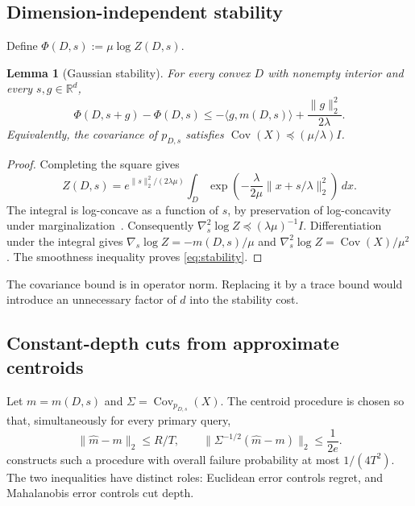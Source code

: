 \documentclass[11pt]{article}
\newcommand{\R}{\mathbb R}
\newcommand{\Cov}{\operatorname{Cov}}
\newcommand{\ip}[2]{\langle #1,#2\rangle}
\newcommand{\norm}[1]{\lVert #1\rVert}
\newtheorem{lemma}[lemma]{Lemma}
\theoremstyle{definition}
\begin{document}
\subsection{Dimension-independent stability}

Define $\Phi(D,s):=\mu\log Z(D,s)$.

\begin{lemma}[Gaussian stability]\label{lem:stability}
For every convex $D$ with nonempty interior and every $s,g\in\R^d$,
\begin{equation}\label{eq:stability}
 \Phi(D,s+g)-\Phi(D,s)
 \le-\ip{g}{m(D,s)}+\frac{\norm{g}_2^2}{2\lambda}.
\end{equation}
Equivalently, the covariance of $p_{D,s}$ satisfies
$\Cov(X)\preceq(\mu/\lambda)I$.
\end{lemma}

\begin{proof}
Completing the square gives
\[
 Z(D,s)=e^{\norm{s}_2^2/(2\lambda\mu)}
 \int_D\exp\!\left(-\frac{\lambda}{2\mu}
                  \norm{x+s/\lambda}_2^2\right)\,dx.
\]
The integral is log-concave as a function of $s$, by preservation of
log-concavity under marginalization~\cite[Theorem~5.1]{lovaszvempala2007}.
Consequently $\nabla_s^2\log Z\preceq(\lambda\mu)^{-1}I$.
Differentiation under the integral gives
$\nabla_s\log Z=-m(D,s)/\mu$ and
$\nabla_s^2\log Z=\Cov(X)/\mu^2$.
The smoothness inequality proves \eqref{eq:stability}.
\end{proof}

The covariance bound is in operator norm. Replacing it by a trace bound
would introduce an unnecessary factor of $d$ into the stability cost.

\subsection{Constant-depth cuts from approximate centroids}

Let $m=m(D,s)$ and $\Sigma=\Cov_{p_{D,s}}(X)$. The centroid procedure is
chosen so that, simultaneously for every primary query,
\begin{equation}\label{eq:centroid-accuracy}
 \norm{\widehat m-m}_2\le R/T,
 \qquad
 \norm{\Sigma^{-1/2}(\widehat m-m)}_2\le\frac1{2e}.
\end{equation}
 constructs such a procedure with overall failure
probability at most $1/(4T^2)$. The two inequalities have distinct roles:
Euclidean error controls regret, and Mahalanobis error controls cut depth.
\end{document}
